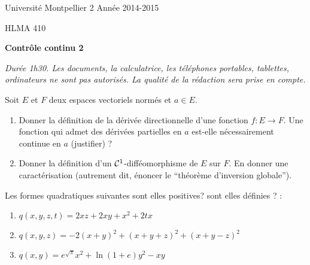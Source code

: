 \documentclass[a4paper]{article}
\begin{document}
\noindent Université Montpellier 2 \hfill Année 2014-2015

\noindent HLMA 410
 


\bigskip

\begin{center}
{\large \sffamily\bfseries Contrôle continu 2}
\end{center}

\textit{Durée 1h30. Les documents, la calculatrice, les téléphones portables, tablettes, ordinateurs ne sont pas autorisés. La qualité de la rédaction sera prise en compte.} 

\bigskip
\bigskip

 Soit $E$ et $F$ deux espaces vectoriels normés et $a\in E$. 
\begin{enumerate}
	\item Donner la définition de la dérivée directionnelle d'une fonction $f:E\to F$. Une fonction qui admet des dérivées partielles en $a$ est-elle nécessairement continue en $a$ (justifier) ?
		\vspace*{5cm}


	\item Donner la définition d'un $\mathcal{C}^{1}$-difféomorphisme de $E$ sur $F$. En donner une caractérisation (autrement dit, énoncer le ``théorème d'inversion globale'').
		\vspace*{7cm}
\end{enumerate}


 Les formes quadratiques suivantes sont elles positives? sont elles définies ? :
\begin{enumerate}
	\item $q(x,y,z,t) = 2xz + 2xy +x^2 + 2tx$
\vspace*{5cm}
	\item $q(x,y,z) = -2(x+y)^2 + (x+y+z)^2 + (x+y-z)^2  $
\vspace*{5cm}
	\item $q(x,y)=e^{\sqrt{\pi}} x^2 + \ln(1+e) y^2 - xy$
\vspace*{5cm}
\end{enumerate}



\end{document}
